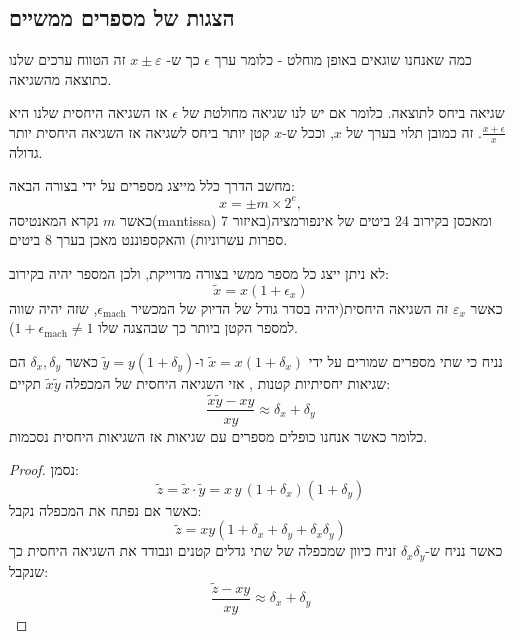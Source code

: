 \documentclass{tstextbook}
\begin{document}
\subsection{הצגות של מספרים ממשיים}

\begin{definition}
כמה שאנחנו שוגאים באופן מוחלט - כלומר ערך \(\epsilon\) כך ש- \(x\pm \varepsilon\) זה הטווח ערכים שלנו כתוצאה מהשגיאה.

\end{definition}
\begin{definition}
שגיאה ביחס לתוצאה. כלומר אם יש לנו שגיאה מחולטת של \(\epsilon\) אז השגיאה היחסית שלנו היא \(\frac{x+\epsilon}{x}\). זה כמובן תלוי בערך של \(x\), וככל ש-\(x\) קטן יותר ביחס לשגיאה אז השגיאה היחסית יותר גדולה.

\end{definition}
\begin{proposition}
מחשב הדרך כלל מייצג מספרים על ידי בצורה הבאה:
$$x=\pm m\times2^{e},$$
כאשר \(m\) נקרא המאנטיסה(mantissa) ומאכסן בקירוב 24 ביטים של אינפורמציה(באיזור 7 ספרות עשרוניות) והאקספוננט מאכן בערך 8 ביטים.

\end{proposition}
\begin{corollary}
לא ניתן ייצג כל מספר ממשי בצורה מדוייקת, ולכן המספר יהיה בקירוב:
$$\tilde{x}=x(1+\epsilon_{x})$$
כאשר \(\varepsilon_{x}\) זה השגיאה היחסית(יהיה בסדר גודל של הדיוק של המכשיר \(\epsilon_{\text{mach}}\), שזה יהיה שווה למספר הקטן ביותר כך שבהצגה שלו \(1+\epsilon_{\text{mach}}\neq 1\)).

\end{corollary}
\begin{proposition}
נניח כי שתי מספרים שמורים על ידי \(\tilde{x}=x(1+\delta_{x})\) ו-\(\tilde{y}=y(1+\delta_{y})\) כאשר \(\delta_{x},\delta_{y}\) הם שגיאות יחסיתיות קטנות , אזי השגיאה היחסית של המכפלה \(\tilde{x}\tilde{y}\) תקיים:
$$\frac{\tilde{x}\tilde{y}-xy}{xy}\approx \delta_{x}+\delta_{y}$$
כלומר כאשר אנחנו כופלים מספרים עם שגיאות אז השגיאות היחסית נסכמות.

\end{proposition}
\begin{proof}
נסמן:
$$\tilde{z}=\tilde{x}\cdot\tilde{y}=x\,y\,(1+\delta_{x})(1+\delta_{y})$$
כאשר אם נפתח את המכפלה נקבל:
$$\tilde{z}=x y\left(1+\delta_{x}+\delta_{y}+\delta_{x}\delta_{y}\right)$$
כאשר נניח ש-\(\delta_{x}\delta_{y}\) זניח כיוון שמכפלה של שתי גדלים קטנים ונבודד את השגיאה היחסית כך שנקבל:
$${\frac{\tilde{z}-x y}{x y}}\approx\delta_{x}+\delta_{y}$$

\end{proof}
\end{document}
